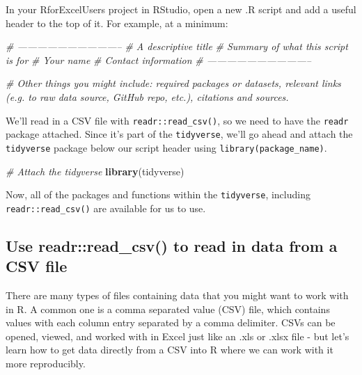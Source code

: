 \documentclass[]{book}
\newenvironment{Shaded}{\begin{snugshade}}{\end{snugshade}}
\newcommand{\CommentTok}[1]{\textcolor[rgb]{0.56,0.35,0.01}{\textit{#1}}}
\newcommand{\KeywordTok}[1]{\textcolor[rgb]{0.13,0.29,0.53}{\textbf{#1}}}
\newcommand{\NormalTok}[1]{#1}
\begin{document}
In your RforExcelUsers project in RStudio, open a new .R script and add a useful header to the top of it. For example, at a minimum:

\begin{Shaded}
\begin{Highlighting}[]
\CommentTok{# --------------------------------}
\CommentTok{# A descriptive title}
\CommentTok{# Summary of what this script is for }
\CommentTok{# Your name}
\CommentTok{# Contact information}
\CommentTok{# --------------------------------}

\CommentTok{# Other things you might include: required packages or datasets, relevant links (e.g. to raw data source, GitHub repo, etc.), citations and sources.}
\end{Highlighting}
\end{Shaded}

We'll read in a CSV file with \texttt{readr::read\_csv()}, so we need to have the \texttt{readr} package attached. Since it's part of the \texttt{tidyverse}, we'll go ahead and attach the \texttt{tidyverse} package below our script header using \texttt{library(package\_name)}.

\begin{Shaded}
\begin{Highlighting}[]
\CommentTok{# Attach the tidyverse}
\KeywordTok{library}\NormalTok{(tidyverse)}
\end{Highlighting}
\end{Shaded}

Now, all of the packages and functions within the \texttt{tidyverse}, including \texttt{readr::read\_csv()} are available for us to use.

\hypertarget{use-readrread_csv-to-read-in-data-from-a-csv-file}{%
\subsection{\texorpdfstring{Use \textbf{readr::read\_csv()} to read in data from a CSV file}{Use readr::read\_csv() to read in data from a CSV file}}\label{use-readrread_csv-to-read-in-data-from-a-csv-file}}

There are many types of files containing data that you might want to work with in R. A common one is a comma separated value (CSV) file, which contains values with each column entry separated by a comma delimiter. CSVs can be opened, viewed, and worked with in Excel just like an .xls or .xlsx file - but let's learn how to get data directly from a CSV into R where we can work with it more reproducibly.
\end{document}
